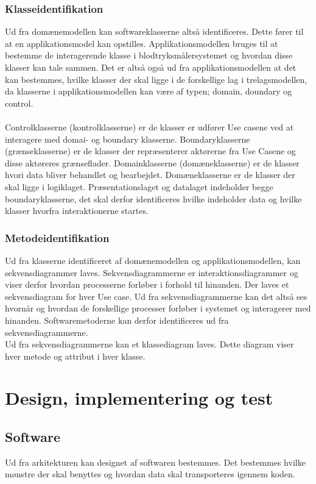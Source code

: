 \subsubsection{Klasseidentifikation}
Ud fra domænemodellen kan softwareklasserne altså identificeres. Dette fører til at en applikationsmodel kan opstilles. Applikationsmodellen bruges til at bestemme de interagerende klasse i blodtryksmålersystemet og hvordan disse klasser kan tale sammen. Det er altså også ud fra applikationsmodellen at det kan bestemmes, hvilke klasser der skal ligge i de forskellige lag i trelagsmodellen, da klasserne i applikationsmodellen kan være af typen; domain, doundary og control.\\\\ Controlklasserne (kontrolklasserne) er de klasser er udfører Use casene ved at interagere med domai- og boundary klasserne. Boundaryklasserne (grænseklasserne) er de klasser der repræsenterer aktørerne fra Use Casene og disse aktøreres grænseflader. Domainklasserne (domæneklasserne) er de klasser hvori data bliver behandlet og bearbejdet. Domæneklasserne er de klasser der skal ligge i logiklaget. Præsentationslaget og datalaget indeholder begge boundaryklasserne, det skal derfor identificeres hvilke indeholder data og hvilke klasser hvorfra interaktionerne startes.
\subsubsection{Metodeidentifikation}
Ud fra klasserne identificeret af domænemodellen og applikationsmodellen, kan sekvensdiagrammer laves. Sekvensdiagrammerne er interaktionsdiagrammer og viser derfor hvordan processerne forløber i forhold til hinanden. Der laves et sekvensdiagram for hver Use case. Ud fra sekvensdiagrammerne kan det altså ses hvornår og hvordan de forskellige processer forløber i systemet og interagerer med hinanden. Softwaremetoderne kan derfor identificeres ud fra sekvensdiagrammerne.\\ 
Ud fra sekvensdiagrammerne kan et klassediagram laves. Dette diagram viser hver metode og attribut i hver klasse.
\section{Design, implementering og test}
\subsection{Software}
Ud fra arkitekturen kan designet af softwaren bestemmes. Det bestemmes hvilke mønstre der skal benyttes og hvordan data skal transporteres igennem koden.
